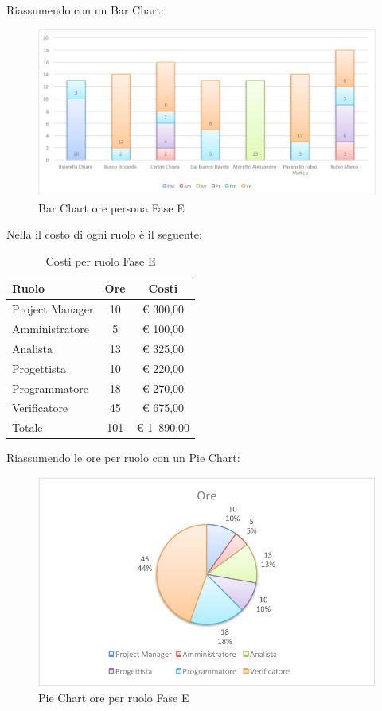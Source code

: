 				Riassumendo con un Bar Chart:
				\begin{figure}[H]\centering
					\includegraphics[width=\textwidth]{PianoDiProgetto/Pics/ChartOreFaseE.pdf}
					\caption{Bar Chart ore persona Fase E}
				\end{figure}
				Nella  il costo di ogni ruolo è il seguente:
				\begin{table}[H]
					\begin{center}
						\begin{tabular}{| l | c | c |}
							\hline
							Ruolo 			& Ore 	& Costi  \\ \hline
							
							Project Manager	& 10 		& \euro{} 300,00 	\\
							Amministratore 		& 5 		& \euro{} 100,00 	\\
							Analista	 		& 13 		& \euro{} 325,00 	\\
							Progettista 		& 10 		& \euro{} 220,00  	\\
							Programmatore		& 18		& \euro{} 270,00 	\\
							Verificatore		& 45 		& \euro{} 675,00 	\\ \hline \hline
							
							Totale	 		& 101 	& \euro{} 1~890,00 	\\ \hline
						\end{tabular}
					\end{center}
					\caption{Costi per ruolo Fase E}
				\end{table}
				Riassumendo le ore per ruolo con un Pie Chart:
				\begin{figure}[H]\centering
					\includegraphics[width=\textwidth]{PianoDiProgetto/Pics/ChartTotOreFaseE.pdf}
					\caption{Pie Chart ore per ruolo Fase E}
				\end{figure}
